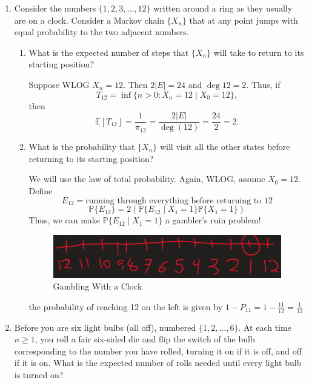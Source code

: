 \documentclass[10pt, oneside]{article}
\newcommand{\bbP}{\mathbb{P}}
\newcommand{\bbE}{\mathbb{E}}
\theoremstyle{definition}
\begin{document}
\begin{enumerate}
    \item Consider the numbers $\{1, 2, 3, \ldots, 12\}$ written around a ring as they usually are on a clock. Consider a Markov chain $\{X_n\}$ that at any point jumps with equal probability to the two adjacent numbers.
        \begin{enumerate}
            \item What is the expected number of steps that $\{X_n\}$ will take to return to its starting position?
            \begin{solution}
            Suppose WLOG $X_n = 12.$ Then
                $2|E| = 24$ and $\deg 12 = 2.$ Thus, if 
                \[T_{12} = \inf\{n>0 : X_n = 12 \mid X_0 = 12\},\] then
                \[\bbE[T_{12}] = \frac{1}{\pi_{12}} = \frac{2|E|}{\deg(12)} = \frac{24}{2} = 2.\]
            \end{solution}
            \item What is the probability that $\{X_n\}$ will visit all the other states before returning to its starting position?
            \begin{solution}
                We will use the law of total probability. Again, WLOG, assume $X_0 = 12.$ Define 
                \[E_{12} = \text{running through everything before returning to 12}\]
                \[\bbP\{E_{12}\} = 2(\bbP\{E_{12} \mid X_1 = 1\}\bbP\{X_1 = 1\})\]
                Thus, we can make 
                $\bbP\{E_{12} \mid X_1 = 1\}$ a gambler's ruin problem! 
\begin{figure}[H]
                    \centering
                    \includegraphics[width=0.5\linewidth]{Images/MarkovProof.png}
                    \caption{Gambling With a Clock}
                \end{figure}
                                
                the probability of reaching 12 on the left is given by $1 - P_{11} = 1 - \frac{11}{12} = \frac{1}{12}$
            \end{solution}
        \end{enumerate}

    \item Before you are six light bulbs (all off), numbered $\{1, 2, \ldots, 6\}$. At each time $n \geq 1$, you roll a fair six-sided die and flip the switch of the bulb corresponding to the number you have rolled, turning it on if it is off, and off if it is on. What is the expected number of rolls needed until every light bulb is turned on?
    


\end{enumerate}
\end{document}
